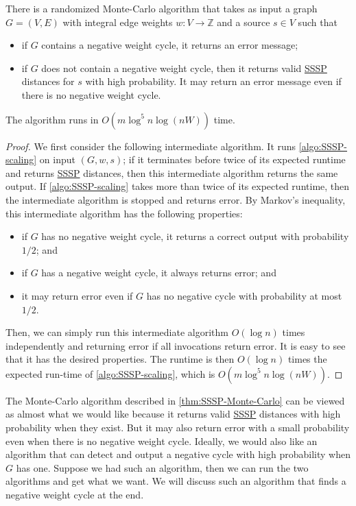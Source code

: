 \begin{theorem}\label{thm:SSSP-Monte-Carlo}
	There is a randomized Monte-Carlo algorithm that takes as input a graph \(G = (V, E)\) with integral edge weights \(w \colon V \to \mathbb{Z} \) and a source \(s \in V\) such that
	\begin{itemize}
		\item if \(G\) contains a negative weight cycle, it returns an error message;
		\item if \(G\) does not contain a negative weight cycle, then it returns valid \hyperref[prb:SSSP]{SSSP} distances for \(s\) with high probability. It may return an error message even if there is no negative weight cycle.
	\end{itemize}
	The algorithm runs in \(O(m \log ^5 n \log (nW))\) time.
\end{theorem}
\begin{proof}
	We first consider the following intermediate algorithm. It runs \autoref{algo:SSSP-scaling} on input \((G, w, s)\); if it terminates before twice of its expected runtime and returns \hyperref[prb:SSSP]{SSSP} distances, then this intermediate algorithm returns the same output. If \autoref{algo:SSSP-scaling} takes more than twice of its expected runtime, then the intermediate algorithm is stopped and returns error. By Markov's inequality, this intermediate algorithm has the following properties:
	\begin{itemize}
		\item if \(G\) has no negative weight cycle, it returns a correct output with probability \(1 / 2\); and
		\item if \(G\) has a negative weight cycle, it always returns error; and
		\item it may return error even if \(G\) has no negative cycle with probability at most \(1 / 2\).
	\end{itemize}

	Then, we can simply run this intermediate algorithm \(O(\log n)\) times independently and returning error if all invocations return error. It is easy to see that it has the desired properties. The runtime is then \(O(\log n)\) times the expected run-time of \autoref{algo:SSSP-scaling}, which is \(O(m \log ^5 n \log (nW))\).
\end{proof}

\begin{remark}
	The Monte-Carlo algorithm described in \autoref{thm:SSSP-Monte-Carlo} can be viewed as almost what we would like because it returns valid \hyperref[prb:SSSP]{SSSP} distances with high probability when they exist. But it may also return error with a small probability even when there is no negative weight cycle. Ideally, we would also like an algorithm that can detect and output a negative cycle with high probability when \(G\) has one. Suppose we had such an algorithm, then we can run the two algorithms and get what we want. We will discuss such an algorithm that finds a negative weight cycle at the end.
\end{remark}

